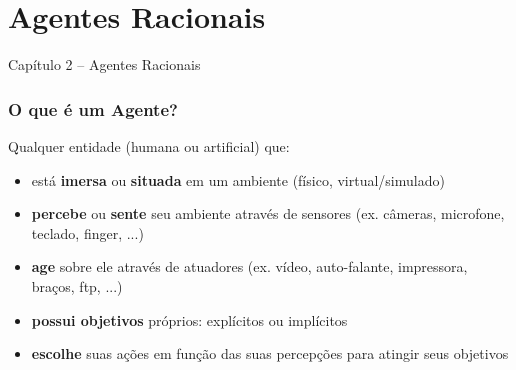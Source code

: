 


\section{Agentes Racionais}


\begin{frame}

\begin{center}
{\huge Capítulo 2 -- Agentes Racionais}
\end{center}

\end{frame}




\begin{frame} [allowframebreaks=0.9]

    \frametitle{O que é um Agente?}

\begin{block}{Qualquer entidade (humana ou artificial) que:}
  
  \begin{itemize}
    \item está \textbf{imersa} ou \textbf{situada} em um ambiente (físico, virtual/simulado) 
    \item \textbf{percebe} ou \textbf{sente} seu ambiente através de sensores (ex. câmeras, microfone, teclado, finger, ...)
    \item \textbf{age} sobre ele através de atuadores (ex. vídeo, auto-falante, impressora, braços, ftp, ...)
    \item \textbf{possui objetivos} próprios:
explícitos ou implícitos
    \item \textbf{escolhe} suas ações em função das suas percepções para atingir seus objetivos
  
  \end{itemize}
  
\end{block}

\end{frame}


